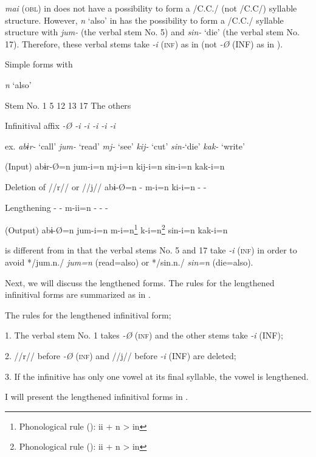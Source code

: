 \textit{mai} (\textsc{obl}) in  does not have a possibility to form a /C.C./ (not /C.C/) syllable structure. However, \textit{n} ‘also’ in  has the possibility to form a /C.C./ syllable structure with \textit{jum-} (the verbal stem No. 5) and \textit{sin-} ‘die’ (the verbal stem No. 17). Therefore, these verbal stems take \textit{-i} (\textsc{inf}) as in  (not \textit{{}-Ø} (INF) as in ).

\begin{table}
\caption{\label{tab:key:82}Simple forms with} \textmd{\textit{n} }\textmd{‘also’}

Stem No.  1  5  12  13  17  The others

Infinitival affix  \textit{{}-Ø  {}-i  {}-i  {}-i  {}-i  {}-i}

ex.  \textit{abɨr-} ‘call’  \textit{jum-} ‘read’  \textit{mj-} ‘see’  \textit{kij-} ‘cut’  \textit{sin-}‘die’  \textit{kak-} ‘write’

(Input)  abɨr-Ø=n  jum-i=n  mj-i=n  kij-i=n  sin-i=n  kak-i=n

Deletion of //r// or //j//  abɨ-Ø=n  {}-  m-i=n  ki-i=n  {}-  {}-

Lengthening  {}-  {}-  m-ii=n  {}-  {}-  {}-

(Output)  abɨ-Ø=n  jum-i=n  m-i=n\footnote{Phonological rule (): ii + n > in}  k-i=n\footnote{Phonological rule (): ii + n > in}  sin-i=n  kak-i=n
\end{table}

 is different from  in that the verbal stems No. 5 and 17 take \textit{{}-i} (\textsc{inf}) in order to avoid */jum.n./ \textit{jum=n} (read=also) or */sin.n./ \textit{sin=n} (die=also).

  Next, we will discuss the lengthened forms. The rules for the lengthened infinitival forms are summarized as in .

\ea\label{ex:8-107}
  The rules for the lengthened infinitival form;

  1.  The verbal stem No. 1 takes \textit{{}-Ø} (\textsc{inf}) and the other stems take \textit{{}-i} (INF);

  2.  //r// before \textit{{}-Ø} (\textsc{inf}) and //j// before \textit{{}-i} (INF) are deleted;

  3.  If the infinitive has only one vowel at its final syllable, the vowel is lengthened.

I will present the lengthened infinitival forms in .

